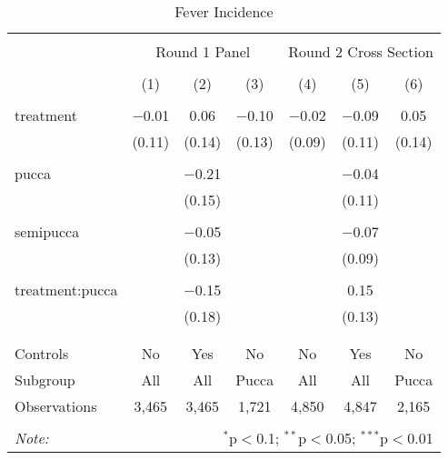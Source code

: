 
\begin{table}[!htbp] \centering 
  \caption{Fever Incidence} 
  \label{tbl:Fever Incidence} 
\begin{tabular}{@{\extracolsep{5pt}}lcccccc} 
\\[-1.8ex]\hline 
\hline \\[-1.8ex] 
 & \multicolumn{3}{c}{Round 1 Panel} & \multicolumn{3}{c}{Round 2 Cross Section} \\ 
\\[-1.8ex] & (1) & (2) & (3) & (4) & (5) & (6)\\ 
\hline \\[-1.8ex] 
 treatment & $-$0.01 & 0.06 & $-$0.10 & $-$0.02 & $-$0.09 & 0.05 \\ 
  & (0.11) & (0.14) & (0.13) & (0.09) & (0.11) & (0.14) \\ 
  & & & & & & \\ 
 pucca &  & $-$0.21 &  &  & $-$0.04 &  \\ 
  &  & (0.15) &  &  & (0.11) &  \\ 
  & & & & & & \\ 
 semipucca &  & $-$0.05 &  &  & $-$0.07 &  \\ 
  &  & (0.13) &  &  & (0.09) &  \\ 
  & & & & & & \\ 
 treatment:pucca &  & $-$0.15 &  &  & 0.15 &  \\ 
  &  & (0.18) &  &  & (0.13) &  \\ 
  & & & & & & \\ 
\hline \\[-1.8ex] 
Controls & No & Yes & No & No & Yes & No \\ 
Subgroup & All & All & Pucca & All & All & Pucca \\ 
Observations & 3,465 & 3,465 & 1,721 & 4,850 & 4,847 & 2,165 \\ 
\hline 
\hline \\[-1.8ex] 
\textit{Note:}  & \multicolumn{6}{r}{$^{*}$p$<$0.1; $^{**}$p$<$0.05; $^{***}$p$<$0.01} \\ 
\end{tabular} 
\end{table} 
